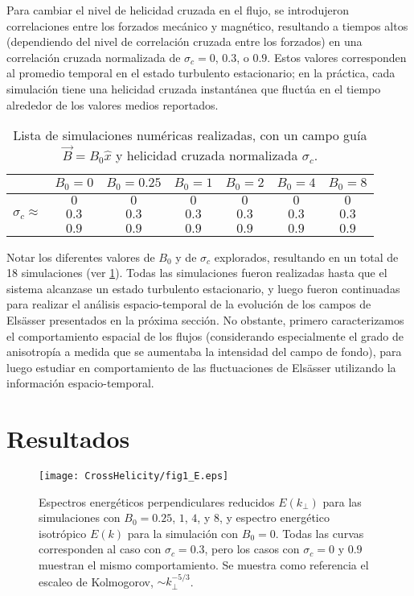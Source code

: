 Para cambiar el nivel de helicidad cruzada en el flujo, se
introdujeron correlaciones entre los forzados mecánico y magnético,
resultando a tiempos altos (dependiendo del nivel de correlación
cruzada entre los forzados) en una correlación cruzada normalizada de
$\sigma_c=0$, $0.3$, o $0.9$. Estos valores corresponden al promedio
temporal en el estado turbulento estacionario; en la práctica, cada
simulación tiene una helicidad cruzada instantánea que fluctúa en el
tiempo alrededor de los valores medios reportados.

\begin{table}
\centering
\begin{tabular}{|l||c||c||c||c||c||c|}
\hline
        & $B_0=0$ & $B_0 = 0.25$ & $B_0 = 1$ & $B_0 = 2$ & $B_0 = 4$ & $B_0 = 8$ \\ \hline\hline
              & $0$ & $0$ & $0$ & $0$ & $0$ & $0$ \\ \cline{2-7} 
$\sigma_c \approx $ & $0.3$ & $0.3$ & $0.3$ & $0.3$ & $0.3$ & $0.3$ \\ \cline{2-7} 
              & $0.9$ & $0.9$ & $0.9$ & $0.9$ & $0.9$ & $0.9$ \\ \hline
\end{tabular}
\caption{Lista de simulaciones numéricas realizadas, con un campo guía
$\vec{B} = B_0 \hat{x}$ y helicidad cruzada normalizada $\sigma_c$.}
\label{tab:listSim}
\end{table}

Notar los diferentes valores de $B_0$ y de $\sigma_c$ explorados,
resultando en un total de 18 simulaciones
(ver \cref{tab:listSim}). Todas las simulaciones fueron realizadas
hasta que el sistema alcanzase un estado turbulento estacionario, y
luego fueron continuadas para realizar el análisis espacio-temporal de
la evolución de los campos de Els\"asser presentados en la próxima
sección. No obstante, primero caracterizamos el comportamiento
espacial de los flujos (considerando especialmente el grado de
anisotropía a medida que se aumentaba la intensidad del campo de
fondo), para luego estudiar en comportamiento de las fluctuaciones de
Els\"asser utilizando la información espacio-temporal.

\section{Resultados}\label{sec4:results}

\begin{figure}
\centering
\texttt{[image: CrossHelicity/fig1\_E.eps]}
\caption{Espectros energéticos perpendiculares reducidos $E(k_\perp)$ para las
  simulaciones con $B_0=0.25$, $1$, $4$, y $8$, y espectro energético
  isotrópico $E(k)$ para la simulación con $B_0=0$. Todas las curvas
  corresponden al caso con $\sigma_c = 0.3$, pero los casos con
  $\sigma_c = 0$ y $0.9$ muestran el mismo comportamiento. Se muestra como
  referencia el escaleo de Kolmogorov, $\sim k_\perp^{-5/3}$.}
\label{fig4-1:E}
\end{figure}

